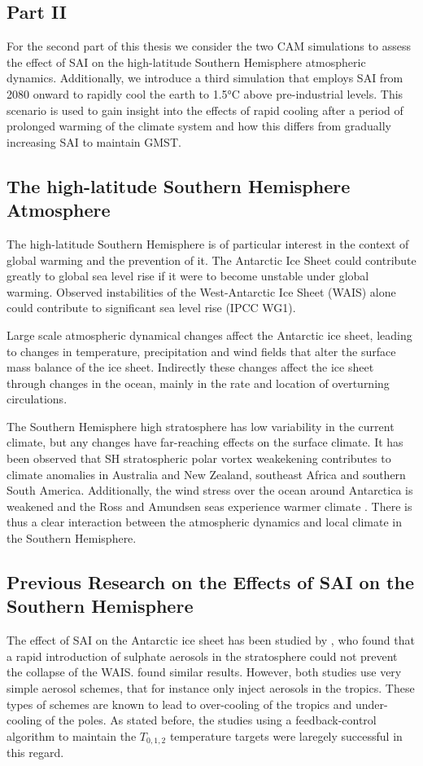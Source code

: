 \subsection*{Part II}
For the second part of this thesis we consider the two CAM simulations to assess the effect of SAI on the high-latitude Southern Hemisphere atmospheric dynamics. Additionally, we introduce a third simulation that employs SAI from 2080 onward to rapidly cool the earth to 1.5°C above pre-industrial levels. This scenario is used to gain insight into the effects of rapid cooling after a period of prolonged warming of the climate system and how this differs from gradually increasing SAI to maintain GMST.

\subsection{The high-latitude Southern Hemisphere Atmosphere}
The high-latitude Southern Hemisphere is of particular interest in the context of global warming and the prevention of it. The Antarctic Ice Sheet could contribute greatly to global sea level rise if it were to become unstable under global warming. Observed instabilities of the West-Antarctic Ice Sheet (WAIS) alone could contribute to significant sea level rise (IPCC WG1). 

Large scale atmospheric dynamical changes affect the Antarctic ice sheet, leading to changes in temperature, precipitation and wind fields that alter the surface mass balance of the ice sheet. Indirectly these changes affect the ice sheet through changes in the ocean, mainly in the rate and location of overturning circulations.

The Southern Hemisphere high stratosphere has low variability in the current climate, but any changes have far-reaching effects on the surface climate. It has been observed that SH stratospheric polar vortex weakekening contributes to climate anomalies in Australia and New Zealand, southeast Africa and southern South America. Additionally, the wind stress over the ocean around Antarctica is weakened and the Ross and Amundsen seas experience warmer climate \parencite{domeisen2020}. There is thus a clear interaction between the atmospheric dynamics and local climate in the Southern Hemisphere. 

\subsection{Previous Research on the Effects of SAI on the Southern Hemisphere}
The effect of SAI on the Antarctic ice sheet has been studied by \textcite{mccusker2015}, who found that a rapid introduction of sulphate aerosols in the stratosphere could not prevent the collapse of the WAIS. \textcite{sutter2023} found similar results. However, both studies use very simple aerosol schemes, that for instance only inject aerosols in the tropics. These types of schemes are known to lead to over-cooling of the tropics and under-cooling of the poles. As stated before, the studies using a feedback-control algorithm to maintain the $T_{0,1,2}$ temperature targets were laregely successful in this regard. 

